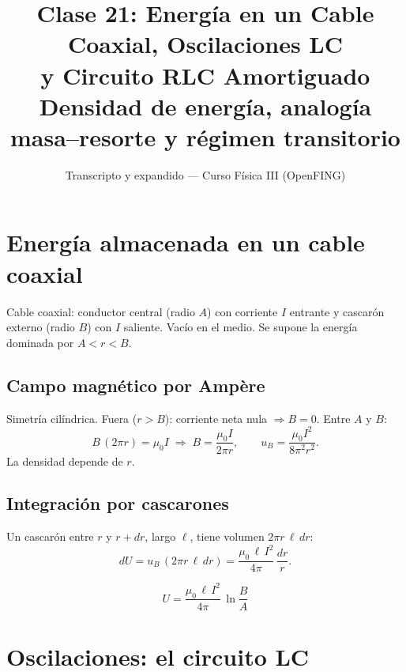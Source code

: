 \documentclass[12pt,a4paper]{article}
\title{\textbf{Clase 21: Energía en un Cable Coaxial, Oscilaciones LC \\
        y Circuito RLC Amortiguado}\\[0.3em]
        \large{Densidad de energía, analogía masa--resorte y régimen transitorio}}
\author{Transcripto y expandido --- Curso Física III (OpenFING)}
\date{}
\begin{document}
\maketitle
\thispagestyle{empty}
\newpage

\tableofcontents
\newpage

\section{Energía almacenada en un cable coaxial}

Cable coaxial: conductor central (radio $A$) con corriente $I$ entrante y
cascarón externo (radio $B$) con $I$ saliente. Vacío en el medio. Se supone la
energía dominada por $A < r < B$.

\subsection{Campo magnético por Ampère}

Simetría cilíndrica. Fuera ($r > B$): corriente neta nula $\Rightarrow B = 0$.
Entre $A$ y $B$:
\[
B\,(2\pi r) = \mu_0 I \;\Longrightarrow\; B = \frac{\mu_0 I}{2\pi r},
\qquad u_B = \frac{\mu_0 I^2}{8\pi^2 r^2}.
\]
La densidad depende de $r$.

\subsection{Integración por cascarones}

Un cascarón entre $r$ y $r+dr$, largo $\ell$, tiene volumen $2\pi r\,\ell\,dr$:
\[
dU = u_B\,(2\pi r\,\ell\,dr) = \frac{\mu_0\,\ell\, I^2}{4\pi}\,\frac{dr}{r}.
\]

\begin{keybox}
  \[
  \boxed{U = \frac{\mu_0\,\ell\, I^2}{4\pi}\,\ln\!\frac{B}{A}}
  \]
\end{keybox}



\section{Oscilaciones: el circuito LC}
\end{document}

